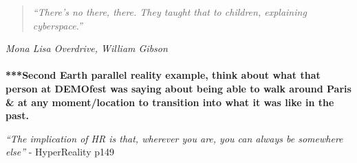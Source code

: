 \begin{quote}
	\textit{``There's no there, there. They taught that to children, explaining cyberspace.''}
\end{quote}
\hfill \textit{Mona Lisa Overdrive, William Gibson}
\\
\\





\textbf{***Second Earth parallel reality example, think about what that person at DEMOfest was saying about being able to walk around Paris \& at any moment/location to transition into what it was like in the past.}

\textit{``The implication of HR is that, wherever you are, you can always be somewhere else''} - HyperReality p149



